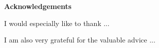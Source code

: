 
\begin{center}
{\LARGE \textbf{Acknowledgements}}
\end{center}


I would especially like to thank ...


I am also very grateful for the valuable advice ...